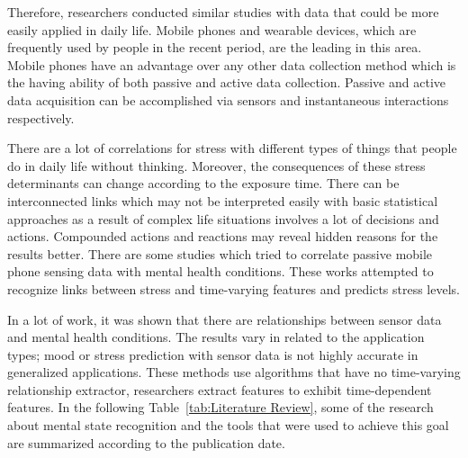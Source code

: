 \documentclass[12pt,oneandhalf,chaparabic,lfm,phd,eng,oneside,pntc]{gsufbe}
\begin{document}
Therefore, researchers conducted similar studies with data that could be more easily applied in daily life. Mobile phones and wearable devices, which are frequently used by people in the recent period, are the leading in this area. Mobile phones have an advantage over any other data collection method which is the having ability of both passive and active data collection. Passive and active data acquisition can be accomplished via sensors and instantaneous interactions respectively. 

There are a lot of correlations for stress with different types of things that people do in daily life without thinking. Moreover, the consequences of these stress determinants can change according to the exposure time. There can be interconnected links which may not be interpreted easily with basic statistical approaches as a result of complex life situations involves a lot of decisions and actions. Compounded actions and reactions may reveal hidden reasons for the results better. There are some studies which tried to correlate passive mobile phone sensing data with mental health conditions. These works attempted to recognize links between stress and time-varying features and predicts stress levels. 

In a lot of work, it was shown that there are relationships between sensor data and mental health conditions. The results vary in related to the application types; mood or stress prediction with sensor data is not highly accurate in generalized applications. These methods use algorithms that have no time-varying relationship extractor, researchers extract features to exhibit time-dependent features. In the following Table~\ref{tab:Literature Review}, some of the research about mental state recognition and the tools that were used to achieve this goal are summarized according to the publication date. 
\end{document}

